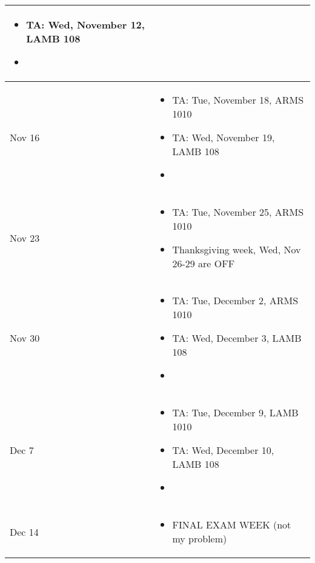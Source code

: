 \documentclass{article}
\begin{document}
\begin{center}
\begin{xltabular}{\linewidth}{ s | M }
\begin{itemize}
    \item TA: Wed, November 12, LAMB 108
    \item
\end{itemize}
\\
\hline
Nov 16 	&
\begin{itemize}
    \item TA: Tue, November 18, ARMS 1010
    \item TA: Wed, November 19, LAMB 108
    \item
\end{itemize}
\\
\hline
Nov 23 	&
\begin{itemize}
    \item TA: Tue, November 25, ARMS 1010
    \item Thanksgiving week, Wed, Nov 26-29 are OFF
\end{itemize}
\\
\hline
Nov 30	&
\begin{itemize}
    \item TA: Tue, December 2, ARMS 1010
    \item TA: Wed, December 3, LAMB 108
    \item
\end{itemize}
\\
\hline
Dec 7 	&
\begin{itemize}
    \item TA: Tue, December 9, LAMB 1010
    \item TA: Wed, December 10, LAMB 108
    \item
\end{itemize}
\\
\hline
Dec 14 	&
\begin{itemize}
    \item FINAL EXAM WEEK (not my problem)
\end{itemize}
\\
\end{xltabular}
\end{center}
\end{document}

